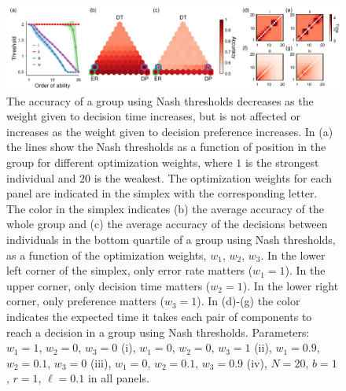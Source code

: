 \documentclass{pnastwo}
\begin{document}
\begin{figure}[ht]
\includegraphics[width=6.83in]{Figure2.pdf}
\caption{\label{groupeq}   The accuracy of a group using Nash thresholds decreases as the weight given to decision time increases, but is not affected or increases as the weight given to decision preference increases.  In (a) the lines show the Nash thresholds as a function of position in the group for different optimization weights,  where $1$ is the strongest individual and $20$ is the weakest. The optimization weights for each panel are indicated in the simplex with the corresponding letter. The color in the simplex indicates (b) the average accuracy of the whole group and (c) the average accuracy of the decisions between individuals in the bottom quartile of a group using Nash thresholds, as a function of the optimization weights, $w_1$, $w_2$, $w_3$.  In the lower left corner of the simplex, only error rate matters ($w_1=1$).  In the upper corner, only decision time matters ($w_2=1$).  In the lower right corner, only preference matters ($w_3=1$).   In (d)-(g) the color indicates the expected time it takes each pair of components to reach a decision in a group using Nash thresholds. Parameters: $w_1=1$, $w_2=0$, $w_3=0$ (i), $w_1=0$, $w_2=0$, $w_3=1$ (ii), $w_1=0.9$, $w_2=0.1$, $w_3=0$ (iii), $w_1=0$, $w_2=0.1$, $w_3=0.9$ (iv), $N=20$, $b=1$, $r=1$, $\ell=0.1$ in all panels. }

\end{figure}
\end{document}
